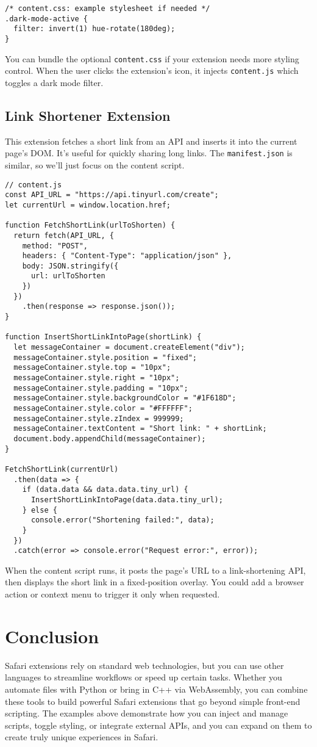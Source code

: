 \documentclass[12pt,a4paper]{article}
\begin{document}
\begin{verbatim}
/* content.css: example stylesheet if needed */
.dark-mode-active {
  filter: invert(1) hue-rotate(180deg);
}
\end{verbatim}

You can bundle the optional \texttt{content.css} if your extension needs more styling control. When the user clicks the extension's icon, it injects \texttt{content.js} which toggles a dark mode filter.

\subsection{Link Shortener Extension}
This extension fetches a short link from an API and inserts it into the current page’s DOM. It’s useful for quickly sharing long links. The \texttt{manifest.json} is similar, so we’ll just focus on the content script.

\begin{verbatim}
// content.js
const API_URL = "https://api.tinyurl.com/create";
let currentUrl = window.location.href;

function FetchShortLink(urlToShorten) {
  return fetch(API_URL, {
    method: "POST",
    headers: { "Content-Type": "application/json" },
    body: JSON.stringify({
      url: urlToShorten
    })
  })
    .then(response => response.json());
}

function InsertShortLinkIntoPage(shortLink) {
  let messageContainer = document.createElement("div");
  messageContainer.style.position = "fixed";
  messageContainer.style.top = "10px";
  messageContainer.style.right = "10px";
  messageContainer.style.padding = "10px";
  messageContainer.style.backgroundColor = "#1F618D";
  messageContainer.style.color = "#FFFFFF";
  messageContainer.style.zIndex = 999999;
  messageContainer.textContent = "Short link: " + shortLink;
  document.body.appendChild(messageContainer);
}

FetchShortLink(currentUrl)
  .then(data => {
    if (data.data && data.data.tiny_url) {
      InsertShortLinkIntoPage(data.data.tiny_url);
    } else {
      console.error("Shortening failed:", data);
    }
  })
  .catch(error => console.error("Request error:", error));
\end{verbatim}

When the content script runs, it posts the page’s URL to a link-shortening API, then displays the short link in a fixed-position overlay. You could add a browser action or context menu to trigger it only when requested.

\section{Conclusion}
Safari extensions rely on standard web technologies, but you can use other languages to streamline workflows or speed up certain tasks. Whether you automate files with Python or bring in C++ via WebAssembly, you can combine these tools to build powerful Safari extensions that go beyond simple front-end scripting. The examples above demonstrate how you can inject and manage scripts, toggle styling, or integrate external APIs, and you can expand on them to create truly unique experiences in Safari.
\end{document}
